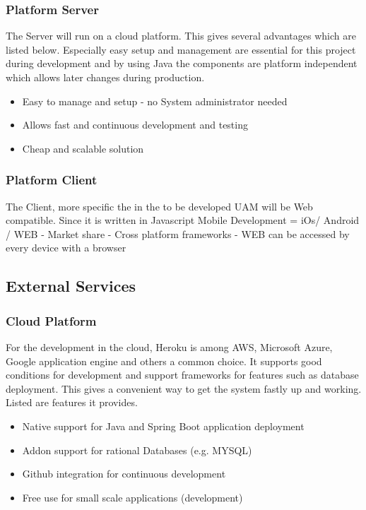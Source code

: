 \documentclass[a4paper,11pt]{article}
\begin{document}
\subsubsection{Platform Server}
The Server will run on a cloud platform. This gives several advantages which are listed below. Especially easy setup and management are essential for this project during development and by using Java the components are platform independent which allows later changes during production.
\begin{itemize}
\item Easy to manage and setup - no System administrator needed
\item Allows fast and continuous development and testing
\item Cheap and scalable solution
\end{itemize}

\subsubsection{Platform Client}
The Client, more specific the in the to be developed UAM will be Web compatible. Since it is written in Javascript
Mobile Development = iOs/ Android / WEB
	- Market share
	- Cross platform frameworks
	- WEB can be accessed by every device with a browser

\subsection{External Services}

\subsubsection{Cloud Platform}
For the development in the cloud, Heroku is among AWS, Microsoft Azure, Google application engine and others a common choice. It supports good conditions for development and support frameworks for features such as database deployment. This gives a convenient way to get the system fastly up and working. Listed are features it provides.
\begin{itemize}
\item Native support for Java and Spring Boot application deployment
\item Addon support for rational Databases (e.g. MYSQL)
\item Github integration for continuous development
\item Free use for small scale applications (development)
\end{itemize}
\end{document}
